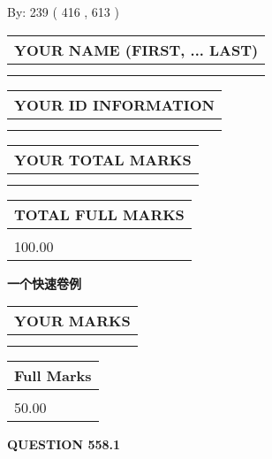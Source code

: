 \documentclass{ctexart}
\begin{document}
   
\hspace{1.0in} By: 
 239 ( 416 ,  613 )
   
   
   
   
\newpage 
\setcounter{page}{ 
   558001 } 
   
   
   
   
\noindent\begin{tabular}{|l|}
\hline
YOUR NAME (FIRST, ... LAST)  \\
\hline
 \\ 
 \\ 
\hline
\end{tabular}
\hspace{0.05in} \begin{tabular}{|l|}
\hline
 YOUR   ID   INFORMATION  \\
\hline
 \\ 
 \\ 
\hline
\end{tabular}
   
   
\vspace{0.2in}\noindent\begin{tabular}{|l|}
\hline
YOUR TOTAL MARKS  \\
\hline
 \\ 
 \\ 
\hline
\end{tabular}
\hspace{0.05in} \begin{tabular}{|l|}
\hline
TOTAL FULL MARKS  \\
\hline
 \\ 
100.00 \\
\hline
\end{tabular}
   
   
 \vspace{0.2in}
{\LARGE {\textbf{ 一个快速卷例}}}
   
   
  
\vspace{0.2in}
  
\noindent\begin{tabular}{|l|}
\hline
 YOUR MARKS  \\
\hline
 \\ 
 \\ 
\hline
\end{tabular}
\hspace{0.05in} \begin{tabular}{|l|}
\hline
 Full Marks  \\
\hline
 \\ 
50.00 \\
\hline
\end{tabular}
{\textbf{\Large{QUESTION
558.1 
}}}
  
\end{document}
